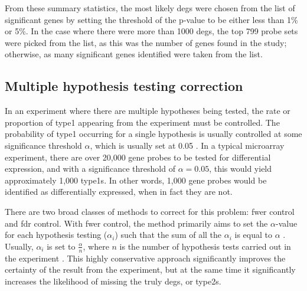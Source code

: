 From these summary statistics, the most likely \glspl{deg} were chosen from the list of significant genes by setting the threshold of the p-value to be either less than 1\% or 5\%.
In the case where there were more than 1000 \glspl{deg}, the top 799 probe sets were picked from the list, as this was the number of genes found in the \citet{Creighton2012} study; otherwise, as many significant genes identified were taken from the list.

\subsection{Multiple hypothesis testing correction}
\label{sub:multiple_hypothesis_testing_correction}

In an experiment where there are multiple hypotheses being tested, the rate or proportion of \gls{type1} appearing from the experiment must be controlled.
The probability of \gls{type1} occurring for a single hypothesis is usually controlled at some significance threshold $\alpha$, which is usually set at 0.05 \citep{Shaffer1995}.
In a typical microarray experiment, there are over 20,000 gene probes to be tested for differential expression, and with a significance threshold of $\alpha = 0.05$, this would yield approximately 1,000 \glspl{type1}.
In other words, 1,000 gene probes would be identified as differentially expressed, when in fact they are not.

There are two broad classes of methods to correct for this problem: \gls{fwer} control and \gls{fdr} control.
With \gls{fwer} control, the method primarily aims to set the $\alpha$-value for each hypothesis testing ($\alpha_i$) such that the sum of all the $\alpha_i$ is equal to $\alpha$ \citep{Hochberg1987,Shaffer1995}.
Usually, $\alpha_i$ is set to $\frac{\alpha}{n}$, where $n$ is the number of hypothesis tests carried out in the experiment \citep{Shaffer1995}.
This highly conservative approach significantly improves the certainty of the result from the experiment, but at the same time it significantly increases the likelihood of missing the truly \glspl{deg}, or \glspl{type2}.

